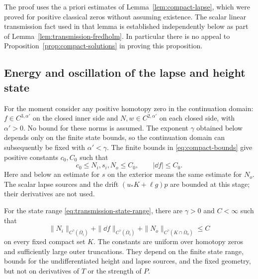 The proof uses the a priori estimates of Lemma~\ref{lem:compact-lapse},
which were proved for positive classical zeros without assuming existence.
The scalar linear transmission fact used in that lemma is established
independently below as part of Lemma~\ref{lem:transmission-fredholm}.
In particular there is no appeal to
Proposition~\ref{prop:compact-solutions} in proving this proposition.

\subsection{Energy and oscillation of the lapse and height state}

For the moment consider any positive homotopy zero in the continuation
domain: $f\in C^{3,\alpha'}$ on the closed inner side and
$N,w\in C^{2,\alpha'}$ on each closed side, with $\alpha'>0$.
No bound for these norms is assumed.  The exponent $\gamma$ obtained
below depends only on the finite state bounds, so the continuation
domain can subsequently be fixed with $\alpha'<\gamma$.
The finite bounds in \eqref{eq:compact-bounds} give positive constants
$c_0,C_0$ such that
\begin{equation}
 c_0\leq N_i,s_i,N_o\leq C_0,
 \qquad |\dd f|\leq C_0.
 \label{eq:transmission-state-range}
\end{equation}
Here and below an estimate for $s$ on the exterior means the same estimate
for $N_o$.  The scalar lapse sources and the drift
$(u_*K+\ell g)p$ are bounded at this stage; their derivatives are not used.

\begin{lemma}
\label{lem:seam-holder}
For the state range \eqref{eq:transmission-state-range}, there are
$\gamma>0$ and $C<\infty$ such that
\begin{equation}
 \|N_i\|_{C^\gamma(\overline\Omega_i)}
 +\|\dd f\|_{C^\gamma(\overline\Omega_i)}
 +\|N_o\|_{C^\gamma(K\cap\overline\Omega_o)}\leq C
 \label{eq:transmission-holder}
\end{equation}
on every fixed compact set $K$.  The constants are uniform over homotopy
zeros and sufficiently large outer truncations.  They depend on the finite
state range, bounds for the undifferentiated height and lapse sources,
and the fixed geometry, but not on derivatives of $T$ or the strength of
$P$.
\end{lemma}


